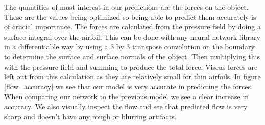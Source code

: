 \documentclass{article} %
\begin{document}
The quantities of most interest in our predictions are the forces on the object. These are the values being optimized so being able to predict them accurately is of crucial importance. The forces are calculated from the pressure field by doing a surface integral over the airfoil. This can be done with any neural network library in a differentiable way by using a 3 by 3 transpose convolution on the boundary to determine the surface and surface normals of the object. Then multiplying this with the pressure field and summing to produce the total force. Viscus forces are left out from this calculation as they are relatively small for thin airfoils. In figure \ref{flow_accuracy} we see that our model is very accurate in predicting the forces. When comparing our network to the previous model we see a clear increase in accuracy. We also visually inspect the flow and see that predicted flow is very sharp and doesn't have any rough or blurring artifacts.
\end{document}
